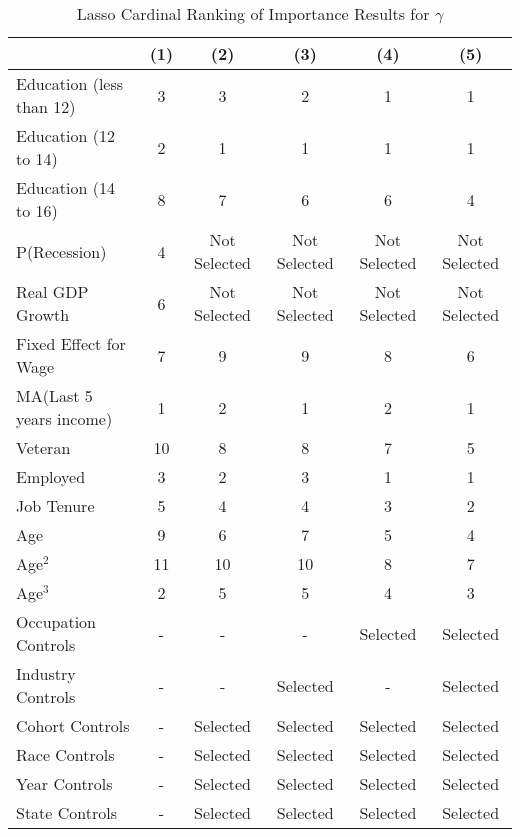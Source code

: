 \documentclass[12pt]{article}
\begin{document}
\begin{table}[H]
\centering
\setlength{\tabcolsep}{3pt} %
\renewcommand{\arraystretch}{1} %
\caption{Lasso Cardinal Ranking of Importance Results for $\gamma$}

\begin{tabular}{lccccc}

\toprule
                    & (1)     & (2)   & (3)    & (4)      & (5)         \\

\midrule
Education (less than 12)                &  3  &  3    &  2  &  1   &  1    \\
Education (12 to 14)                &  2  &  1    &  1  &  1   &  1    \\
Education (14 to 16)                &  8  &  7    &  6  &  6   &  4    \\
P(Recession)             &  4    & Not Selected    & Not Selected   & Not Selected    & Not Selected     \\
Real GDP Growth            &  6    & Not Selected     & Not Selected   & Not Selected    & Not Selected     \\
Fixed Effect for Wage         &  7   &  9     &  9   &  8    &  6     \\
MA(Last 5 years income)              &  1   &  2     &  1   &  2    &  1     \\
Veteran             &  10   &  8     &  8   &  7    &  5     \\
Employed                 &  3   &  2     &  3   &  1    &  1     \\
Job Tenure               &  5   &  4     &  4   &  3    &  2     \\
Age          &  9   &  6     &  7   &  5    &  4     \\
Age$^2$        &  11  &  10    &  10  &  8   &  7    \\
Age$^3$      &  2  &  5    &  5  &  4   &  3    \\

\midrule
Occupation Controls      & -   & -    & -  & Selected   & Selected    \\
Industry Controls      & -  & -    & Selected  & -   & Selected    \\
Cohort Controls      & -  & Selected    & Selected  & Selected   & Selected    \\
Race Controls      & -  & Selected    & Selected  & Selected   & Selected    \\
Year Controls      & -  & Selected    & Selected  & Selected   & Selected    \\
State Controls      & -  & Selected    & Selected  & Selected   & Selected    \\



\end{tabular}
\end{table}
\end{document}
